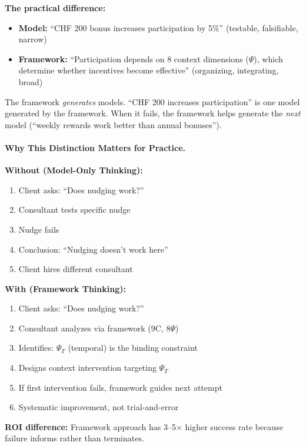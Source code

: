 \textbf{The practical difference:}
\begin{itemize}[nosep]
    \item \textbf{Model:} ``CHF 200 bonus increases participation by 5\%'' (testable, falsifiable, narrow)
    \item \textbf{Framework:} ``Participation depends on 8 context dimensions ($\Psi$), which determine whether incentives become effective'' (organizing, integrating, broad)
\end{itemize}

The framework \textit{generates} models. ``CHF 200 increases participation'' is one model generated by the framework. When it fails, the framework helps generate the \textit{next} model (``weekly rewards work better than annual bonuses'').

\paragraph{Why This Distinction Matters for Practice.}

\begin{tcolorbox}[colback=blue!5!white, colframe=blue!75!black,
    title=\textbf{Without vs.\ With the Distinction}]

\textbf{Without (Model-Only Thinking):}
\begin{enumerate}[nosep]
    \item Client asks: ``Does nudging work?''
    \item Consultant tests specific nudge
    \item Nudge fails
    \item Conclusion: ``Nudging doesn't work here''
    \item Client hires different consultant
\end{enumerate}

\textbf{With (Framework Thinking):}
\begin{enumerate}[nosep]
    \item Client asks: ``Does nudging work?''
    \item Consultant analyzes via framework (9C, 8$\Psi$)
    \item Identifies: $\Psi_T$ (temporal) is the binding constraint
    \item Designs context intervention targeting $\Psi_T$
    \item If first intervention fails, framework guides next attempt
    \item Systematic improvement, not trial-and-error
\end{enumerate}

\textbf{ROI difference:} Framework approach has 3--5$\times$ higher success rate because failure informs rather than terminates.

\end{tcolorbox}

